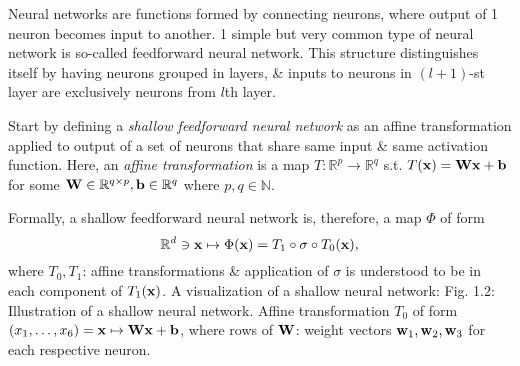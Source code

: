 \documentclass{article}
\begin{document}
\begin{enumerate}
\begin{itemize}
\begin{itemize}
\begin{itemize}
				Neural networks are functions formed by connecting neurons, where output of 1 neuron becomes input to another. 1 simple but very common type of neural network is so-called feedforward neural network. This structure distinguishes itself by having neurons grouped in layers, \& inputs to neurons in $(l + 1)$-st layer are exclusively neurons from $l$th layer.
				
				Start by defining a {\it shallow feedforward neural network} as an affine transformation applied to output of a set of neurons that share same input \& same activation function. Here, an {\it affine transformation} is a map $T:\mathbb{R}^p\to\mathbb{R}^q$ s.t. $T({\bf x}) = {\bf W}{\bf x} + {\bf b}$ for some ${\bf W}\in\mathbb{R}^{q\times p},{\bf b}\in\mathbb{R}^q$ where $p,q\in\mathbb{N}$.
				
				Formally, a shallow feedforward neural network is, therefore, a map $\Phi$ of form
				\begin{equation}
					\label{shallow feedforward neural network}
					\mathbb{R}^d\ni{\bf x}\mapsto\Phi({\bf x}) = T_1\circ\sigma\circ T_0({\bf x}),
				\end{equation}
				where $T_0,T_1$: affine transformations \& application of $\sigma$ is understood to be in each component of $T_1({\bf x})$. A visualization of a shallow neural network: {\sf Fig. 1.2: Illustration of a shallow neural network. Affine transformation $T_0$ of form $(x_1,\ldots,x_6) = {\bf x}\mapsto{\bf W}{\bf x} + {\bf b}$, where rows of ${\bf W}$: weight vectors ${\bf w}_1,{\bf w}_2,{\bf w}_3$ for each respective neuron.}
				

\end{itemize}
\end{itemize}
\end{itemize}
\end{enumerate}
\end{document}

